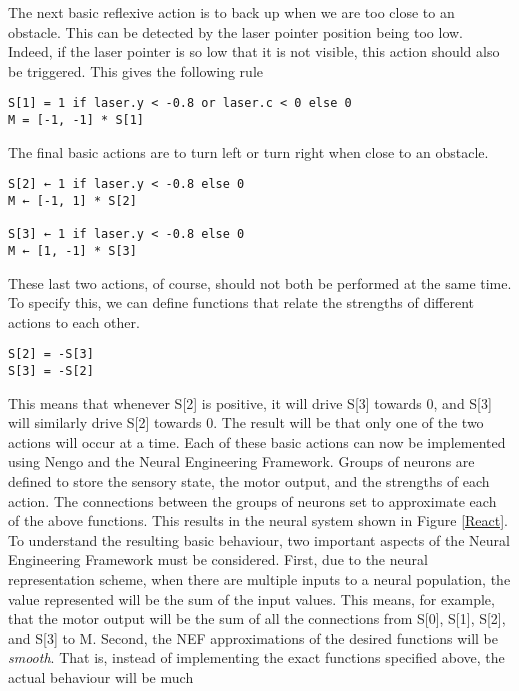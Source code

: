 \documentclass[conference]{IEEEtran}
\begin{document}
The next basic reflexive action is to back up when we are
too close to an obstacle. This can be detected by the laser
pointer position being too low. Indeed, if the laser pointer is
so low that it is not visible, this action should also be
triggered. This gives the following rule

\begin{lstlisting}
S[1] = 1 if laser.y < -0.8 or laser.c < 0 else 0
M = [-1, -1] * S[1]
\end{lstlisting}

The final basic actions are to turn left or turn right when
close to an obstacle. 

\begin{lstlisting}
S[2] ← 1 if laser.y < -0.8 else 0
M ← [-1, 1] * S[2]

S[3] ← 1 if laser.y < -0.8 else 0
M ← [1, -1] * S[3]
\end{lstlisting}

These last two actions, of course, should not both be
performed at the same time. To specify this, we can define
functions that relate the strengths of different actions to
each other.

\begin{lstlisting}
S[2] = -S[3]
S[3] = -S[2]
\end{lstlisting}

This means that whenever S[2] is positive, it will drive
S[3] towards 0, and S[3] will similarly drive S[2] towards 0.
The result will be that only one of the two actions will occur
at a time.
Each of these basic actions can now be implemented
using Nengo and the Neural Engineering Framework.
Groups of neurons are defined to store the sensory state, the
motor output, and the strengths of each action. The
connections between the groups of neurons set to
approximate each of the above functions. This results in the
neural system shown in Figure \ref{React}.
To understand the resulting basic behaviour, two important
aspects of the Neural Engineering Framework must be
considered. First, due to the neural representation scheme,
when there are multiple inputs to a neural population, the
value represented will be the sum of the input values. This
means, for example, that the motor output will be the sum
of all the connections from S[0], S[1], S[2], and S[3] to M.
Second, the NEF approximations of the desired functions
will be \textit{smooth}. That is, instead of implementing the exact
functions specified above, the actual behaviour will be much
\end{document}
